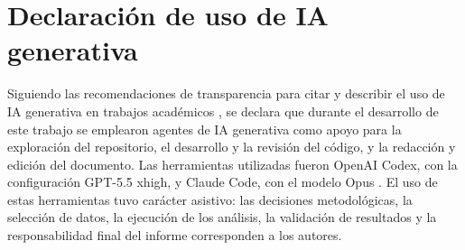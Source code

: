 \documentclass[doc,11pt,donotrepeattitle]{apa7}
\begin{document}


\newpage
\section*{Declaración de uso de IA generativa}

Siguiendo las recomendaciones de transparencia para citar y describir el uso de IA generativa
en trabajos académicos \parencite{mcadoo2025generativeai}, se declara que durante el desarrollo
de este trabajo se emplearon agentes de IA generativa como apoyo para la exploración del
repositorio, el desarrollo y la revisión del código, y la redacción y edición del documento.
Las herramientas utilizadas fueron OpenAI Codex, con la configuración GPT-5.5 xhigh, y Claude
Code, con el modelo Opus \parencite{openai2026codex,anthropic2026claude_code_opus}. El uso de
estas herramientas tuvo carácter asistivo: las decisiones metodológicas, la selección de datos,
la ejecución de los análisis, la validación de resultados y la responsabilidad final del informe
corresponden a los autores.

\newpage
\printbibliography[title={Referencias bibliográficas}, heading=bibintoc]


\end{document}
